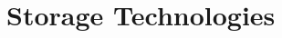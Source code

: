 \documentclass[nomenclature, english, biblatex]{kththesis}
\numberwithin{listing}{chapter}
\begin{document}






%

\section{Storage Technologies}
\label{sec:storage}
\end{document}
